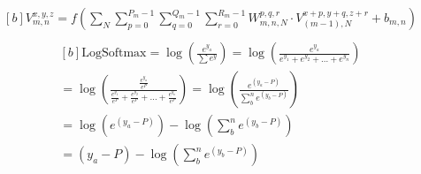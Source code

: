 \documentclass[]{interact}
\theoremstyle{plain}%
\theoremstyle{definition}
\theoremstyle{remark}
\begin{document}
\begin{equation}\label{eq:1}
\begin{aligned}[b]
V_{m, n}^{x, y, z}=f\left(\sum_{N} \sum_{p=0}^{P_{m}-1} \sum_{q=0}^{Q_{m}-1} \sum_{r=0}^{R_{m}-1}W_{m, n, N}^{p, q, r} \cdot V_{(m-1), N}^{x+p, y+q, z+r}+b_{m, n}\right) \\
\end{aligned}
\end{equation}
\begin{equation}\label{eq:3}
\begin{aligned}[b]
\mathrm{LogSoftmax}=\log \left(\frac{e^{y_{a}}}{\sum e^{y}}\right)=\log \left(\frac{e^{y_{a}}}{e^{y_{1}}+e^{y_{2}}+\ldots+e^{y_{n}}}\right) \\ =\log \left(\frac{\frac{e^{y_{a}}}{e^{P}}}{\frac{e^{y_{1}}}{e^{P}}+\frac{e^{y_{2}}}{e^{P}}+\ldots+\frac{e^{y_{n}}}{e^{P}}}\right)=\log \left(\frac{e^{\left(y_{a}-P\right)}}{\sum_{b}^{n} e^{\left(y_{b}-P\right)}}\right) \\ =\log \left(e^{\left(y_{a}-P\right)}\right)-\log \left(\sum_{b}^{n} e^{\left(y_{b}-P\right)}\right)\\=\left(y_{a}-P\right)-\log \left(\sum_{b}^{n} e^{\left(y_{b}-P\right)}\right)
\end{aligned}
\end{equation}
\end{document}
